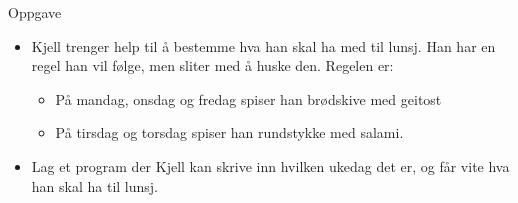 \documentclass[screen, aspectratio=169]{beamer}
\begin{document}
\begin{frame}{Oppgave}
	\begin{itemize}
		\item Kjell trenger help til å bestemme hva han skal ha med til lunsj. Han har en regel han vil følge, men sliter med å huske den. Regelen er:
		\begin{itemize}
			\item På mandag, onsdag og fredag spiser han brødskive med geitost
			\item På tirsdag og torsdag spiser han rundstykke med salami.
		\end{itemize}
		\item Lag et program der Kjell kan skrive inn hvilken ukedag det er, og får vite hva han skal ha til lunsj.
	\end{itemize}
\end{frame}
\end{document}
